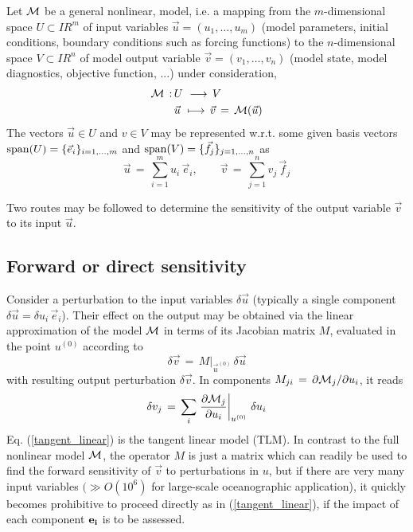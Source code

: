 Let $ \cal{M} $ be a general nonlinear, model, i.e. a
mapping from the $m$-dimensional space 
$U \subset I\!\!R^m$ of input variables 
$\vec{u}=(u_1,\ldots,u_m)$
(model parameters, initial conditions, boundary conditions
such as forcing functions) to the $n$-dimensional space 
$V \subset I\!\!R^n$ of 
model output variable $\vec{v}=(v_1,\ldots,v_n)$ 
(model state, model diagnostics, objective function, ...) 
under consideration,
%
\begin{equation}
\begin{split}
{\cal M} \, : & \, U \,\, \longrightarrow \, V \\
~      & \, \vec{u} \,\, \longmapsto \, \vec{v} \, = \, 
{\cal M}(\vec{u}) 
\label{fulloperator}
\end{split}
\end{equation}
%
The vectors $ \vec{u} \in U $ and $ v \in V $ may be represented w.r.t.
some given basis vectors
$ {\rm span} (U) = \{ {\vec{e}_i} \}_{i = 1, \ldots , m} $ and
$ {\rm span} (V) = \{ {\vec{f}_j} \}_{j = 1, \ldots , n} $ as
\[
\vec{u} \, = \, \sum_{i=1}^{m} u_i \, {\vec{e}_i},
\qquad
\vec{v} \, = \, \sum_{j=1}^{n} v_j \, {\vec{f}_j}
\]

Two routes may be followed to determine the sensitivity of the 
output variable $\vec{v}$ to its input $\vec{u}$.

\subsection{Forward or direct sensitivity}
%
Consider a perturbation to the input variables $\delta \vec{u}$
(typically a single component 
$\delta \vec{u} = \delta u_{i} \, {\vec{e}_{i}}$).
Their effect on the output may be obtained via the linear
approximation of the model $ {\cal M}$ in terms of its Jacobian matrix
$ M $, evaluated in the point $u^{(0)}$ according to
%
\begin{equation}
\delta \vec{v} \, = \, M |_{\vec{u}^{(0)}} \, \delta \vec{u}
\label{tangent_linear}
\end{equation}
with resulting output perturbation $\delta \vec{v}$.
In components
$M_{j i} \, = \, \partial {\cal M}_{j} / \partial u_{i} $, 
it reads
%
\begin{equation}
\delta v_{j} \, = \, \sum_{i} 
\left. \frac{\partial {\cal M}_{j}}{\partial u_{i}} \right|_{u^{(0)}} \, 
\delta u_{i}
\label{jacobi_matrix}
\end{equation}
%
Eq. (\ref{tangent_linear}) is the {\sf tangent linear model (TLM)}.
In contrast to the full nonlinear model $ {\cal M} $, the operator
$ M $ is just a matrix
which can readily be used to find the forward sensitivity of $\vec{v}$ to 
perturbations in  $u$,
but if there are very many input variables $(\gg O(10^{6})$ for 
large-scale oceanographic application), it quickly becomes 
prohibitive to proceed directly as in (\ref{tangent_linear}),
if the impact of each component $ {\bf e_{i}} $ is to be assessed. 

